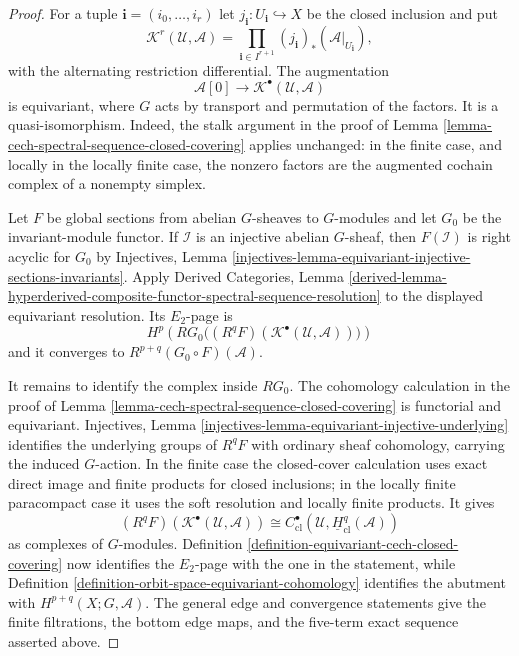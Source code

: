 \begin{proof}
For a tuple $\mathbf i=(i_0,\ldots,i_r)$ let
$j_{\mathbf i}:U_{\mathbf i}\hookrightarrow X$ be the closed inclusion and
put
$$
\mathcal K^r(\mathcal U,\mathcal A)=
\prod_{\mathbf i\in I^{r+1}}
(j_{\mathbf i})_*(\mathcal A|_{U_{\mathbf i}}),
$$
with the alternating restriction differential.  The augmentation
$$
\mathcal A[0]\longrightarrow
\mathcal K^\bullet(\mathcal U,\mathcal A)
$$
is equivariant, where $G$ acts by transport and permutation of the factors.
It is a quasi-isomorphism.  Indeed, the stalk argument in the proof of Lemma
\ref{lemma-cech-spectral-sequence-closed-covering} applies unchanged: in the
finite case, and locally in the locally finite case, the nonzero factors are
the augmented cochain complex of a nonempty simplex.

Let $F$ be global sections from abelian $G$-sheaves to $G$-modules and let
$G_0$ be the invariant-module functor.  If $\mathcal I$ is an injective
abelian $G$-sheaf, then $F(\mathcal I)$ is right acyclic for $G_0$ by
Injectives, Lemma
\ref{injectives-lemma-equivariant-injective-sections-invariants}.  Apply
Derived Categories, Lemma
\ref{derived-lemma-hyperderived-composite-functor-spectral-sequence-resolution}
to the displayed equivariant resolution.  Its $E_2$-page is
$$
H^p\left(RG_0\bigl(
(R^qF)(\mathcal K^\bullet(\mathcal U,\mathcal A))\bigr)\right)
$$
and it converges to $R^{p+q}(G_0\circ F)(\mathcal A)$.

It remains to identify the complex inside $RG_0$.  The cohomology
calculation in the proof of Lemma
\ref{lemma-cech-spectral-sequence-closed-covering} is functorial and
equivariant.  Injectives, Lemma
\ref{injectives-lemma-equivariant-injective-underlying} identifies the
underlying groups of $R^qF$ with ordinary sheaf cohomology, carrying the
induced $G$-action.  In the finite case the closed-cover calculation uses
exact direct image and finite products for closed inclusions; in the locally
finite paracompact case it uses the soft resolution and locally finite
products.  It gives
$$
(R^qF)(\mathcal K^\bullet(\mathcal U,\mathcal A))
\cong
C^\bullet_{\mathrm{cl}}(
\mathcal U,\underline H^q_{\mathrm{cl}}(\mathcal A))
$$
as complexes of $G$-modules.  Definition
\ref{definition-equivariant-cech-closed-covering} now identifies the
$E_2$-page with the one in the statement, while Definition
\ref{definition-orbit-space-equivariant-cohomology} identifies the abutment
with $H^{p+q}(X;G,\mathcal A)$.  The general edge and convergence statements
give the finite filtrations, the bottom edge maps, and the five-term exact
sequence asserted above.
\end{proof}

